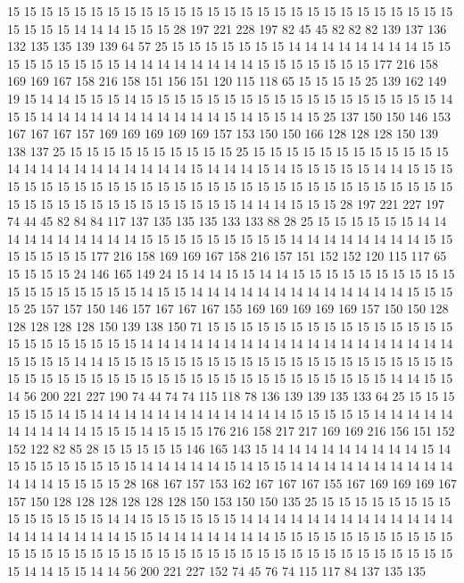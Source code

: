 15 15 15 15 15 15 15 15 15 15 15 15 15 15 15 15 15 15 15 15
15 15 15 15 15 15 15 15 15 15 15 14 14 14 15 15 15 28 197 221
228 197 82 45 45 82 82 82 139 137 136 132 135 135 139 139 64 57 25 15
15 15 15 15 15 15 14 14 14 14 14 14 14 14 15 15 15 15 15 15
15 15 15 14 14 14 14 14 14 14 14 15 15 15 15 15 15 15 177 216
158 169 169 167 158 216 158 151 156 151 120 115 118 65 15 15 15 15 25 139
162 149 19 15 14 14 15 15 15 14 15 15 15 15 15 15 15 15 15 15
15 15 15 15 15 15 15 15 14 15 15 14 14 14 14 14 14 14 14 14
14 14 15 14 15 15 14 15 25 137 150 150 146 153 167 167 167 157 169 169
169 169 169 157 153 150 150 166 128 128 128 150 139 138 137 25 15 15 15 15
15 15 15 15 15 15 25 15 15 15 15 15 15 15 15 15 15 15 15 14
14 14 14 14 14 14 14 14 14 14 15 14 14 14 15 14 15 15 15 15
15 14 14 15 15 15 15 15 15 15 15 15 15 15 15 15 15 15 15 15
15 15 15 15 15 15 15 15 15 15 15 15 15 15 15 15 15 15 15 15
15 15 15 15 15 15 15 14 14 14 15 15 15 28 197 221 227 197 74 44
45 82 84 84 117 137 135 135 135 133 133 88 28 25 15 15 15 15 15 15
14 14 14 14 14 14 14 14 14 14 15 15 15 15 15 15 15 15 15 14
14 14 14 14 14 14 14 15 15 15 15 15 15 15 177 216 158 169 169 167
158 216 157 151 152 152 120 115 117 65 15 15 15 15 24 146 165 149 24 15
14 14 15 15 14 14 15 15 15 15 15 15 15 15 15 15 15 15 15 15
15 15 15 15 14 15 15 14 14 14 14 14 14 14 14 14 14 14 14 14
15 15 15 15 25 157 157 150 146 157 167 167 167 155 169 169 169 169 169 157
150 150 128 128 128 128 128 150 139 138 150 71 15 15 15 15 15 15 15 15
15 15 15 15 15 15 15 15 15 15 15 15 15 15 15 14 14 14 14 14
14 14 14 14 14 14 14 14 14 14 14 14 14 14 15 15 15 15 14 14
15 15 15 15 15 15 15 15 15 15 15 15 15 15 15 15 15 15 15 15
15 15 15 15 15 15 15 15 15 15 15 15 15 15 15 15 15 15 15 15
15 15 15 15 14 14 15 15 14 56 200 221 227 190 74 44 74 74 115 118
78 136 139 139 135 133 64 25 15 15 15 15 15 15 14 15 14 14 14 14
14 14 14 14 14 14 14 14 15 15 15 15 15 14 14 14 14 14 14 14
14 14 14 15 15 15 14 15 15 15 176 216 158 217 217 169 169 216 156 151
152 152 122 82 85 28 15 15 15 15 15 146 165 143 15 14 14 14 14 14
14 14 14 14 15 14 15 15 15 15 15 15 15 15 14 14 14 14 14 15
14 15 15 14 14 14 14 14 14 14 14 14 14 14 14 14 15 15 15 15
28 168 167 157 153 162 167 167 167 155 167 169 169 169 167 157 150 128 128 128
128 128 128 150 153 150 150 135 25 15 15 15 15 15 15 15 15 15 15 15
15 15 15 14 14 15 15 15 15 15 15 14 14 14 14 14 14 14 14 14
14 14 14 14 14 14 14 14 14 14 14 15 15 14 14 14 14 14 14 14
15 15 15 15 15 15 15 15 15 15 15 15 15 15 15 15 15 15 15 15
15 15 15 15 15 15 15 15 15 15 15 15 15 15 15 15 15 15 15 14
14 15 15 14 14 56 200 221 227 152 74 45 76 74 115 117 84 137 135 135
